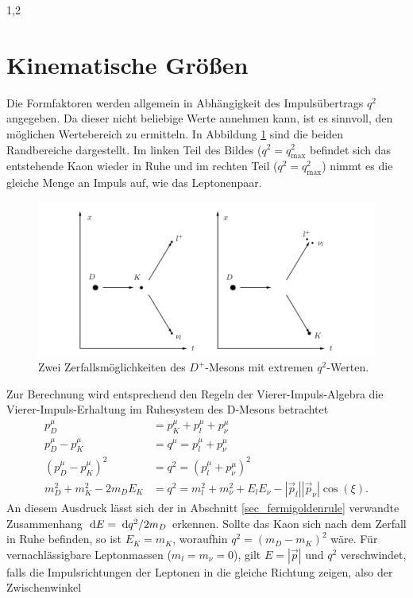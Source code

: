\documentclass[11pt,a4paper,twoside,draft]{report}
\begin{document}
\begin{spacing}{1,2}
\section{Kinematische Größen}
Die Formfaktoren werden allgemein in Abhängigkeit des Impulsübertrags $q^2$ angegeben. Da dieser nicht beliebige Werte annehmen kann, ist es sinnvoll, den 
möglichen Wertebereich zu ermitteln.  In Abbildung \ref{pic_DZerfall} sind die beiden Randbereiche dargestellt. Im linken Teil des Bildes ($q^2=q^2_\text{max}$
befindet sich das entstehende Kaon wieder in Ruhe und im rechten Teil ($q^2=q^2_\text{max}$) nimmt es die gleiche Menge an Impuls auf, wie das Leptonenpaar.
\begin{figure}[h]
\includegraphics[width=1\textwidth]{Abbildungen/DZerfall.png}
\caption{Zwei Zerfallsmöglichkeiten des $D^+$-Mesons  mit extremen $q^2$-Werten.}
\label{pic_DZerfall}
\end{figure}
\noindent
Zur Berechnung wird entsprechend den Regeln der Vierer-Impuls-Algebra die Vierer-Impuls-Erhaltung im Ruhesystem des D-Mesons betrachtet
\begin{align}
 p_D^\mu &= p_K^\mu + p_l^\mu + p_\nu^\mu \nonumber\\
 p_D^\mu - p_K^\mu &= q^\mu = p_l^\mu + p_\nu^\mu \nonumber\\
 \left(p_D^\mu-p_K^\mu\right)^2 &= q^2 =  (p_l^\mu + p_\nu^\mu )^2\nonumber\\
 m_D^2 + m_K^2 - 2m_DE_K &= q^2 = m_l^2 + m_\nu^2 + E_lE_\nu - |\vec p_l||\vec p_\nu|\cos(\xi).
\end{align}
An diesem Ausdruck lässt sich der in Abschnitt \ref{sec_fermigoldenrule} verwandte Zusammenhang $\; \mathrm{d} E = \; \mathrm{d} q^2/2m_D$ erkennen.
Sollte das Kaon sich nach dem Zerfall in Ruhe befinden, so ist $E_K = m_K$, woraufhin $q^2 = (m_D-m_K)^2$ wäre. Für vernachlässigbare Leptonmassen 
($m_l=m_\nu=0$), gilt $E=|\vec p|$ und $q^2$ verschwindet, falls die Impulsrichtungen der Leptonen in die gleiche Richtung zeigen, also der Zwischenwinkel

\end{spacing}
\end{document}
